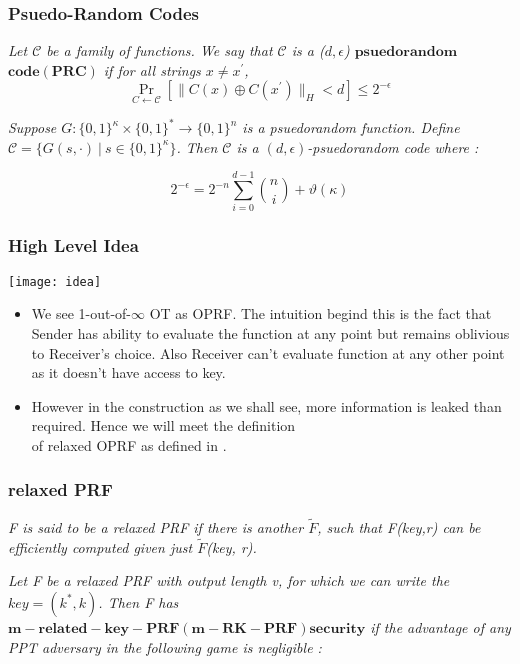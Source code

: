 \documentclass[hyperref={pdfpagelabels=false}]{beamer}
\theoremstyle{remark}
\begin{document}
\begin{frame}
\frametitle{Psuedo-Random Codes}
\begin{definition}[2]
\textit{Let $\mathcal{C}$ be a family of functions. We say that $\mathcal{C}$ is a ($d,\epsilon$) $\mathbf{psuedorandom}$ $\mathbf{code(PRC)}$ if for all strings $x \neq x^\prime$,}
\begin{equation*}
\Pr_{C\leftarrow \mathcal{C}} \left[ \|C(x) \oplus C(x^\prime)\|_H < d \right] \leq 2^{-\epsilon}
\end{equation*}
\end{definition}\pause

\begin{lemma}[1]
\textit{Suppose $G : \{0,1\}^\kappa \times \{0,1\}^* \rightarrow \{0,1\}^n$ is a psuedorandom function. Define $\mathcal{C} = \{G(s,\cdot) \  | \ s \in \{0,1\}^\kappa\}$. Then $\mathcal{C}$ is a $(d,\epsilon)$-psuedorandom code where : }

\begin{equation*}
2^{-\epsilon} = 2^{-n}\sum_{i=0}^{d-1} {n \choose i} + \vartheta(\kappa)
\end{equation*}
\end{lemma}
\end{frame}

\begin{frame}
\frametitle{High Level Idea}
\begin{center}\texttt{[image: idea]}\end{center}
\begin{itemize}

\item We see 1-out-of-$\infty$ OT as OPRF. The intuition begind this is the fact that Sender has ability to  evaluate the function at any point but remains oblivious to Receiver's choice. Also Receiver can't evaluate function at any other point as it doesn't have access to key.\pause

\item However in the construction as we shall see, more information is leaked than required. Hence we will meet the definition\\ of \textsf{relaxed OPRF} as defined in \cite{FIPR}.

\end{itemize}
\end{frame}

\begin{frame}
\frametitle{relaxed PRF}
\begin{definition}[3]
\textit{F is said to be a \textsf{relaxed PRF} if there is another $\widetilde{F}$, such that F(key,r) can be efficiently computed given just $\widetilde{F}$(key, r).}
\end{definition}\pause

\begin{definition}[4]
\textit{Let F be a relaxed PRF with output length v, for which we can write the $key = (k^*,k)$. Then F has $\mathbf{m-related-key-PRF (m-RK-PRF) security}$ if the advantage of any PPT adversary in the following game is negligible :
}
\end{definition}
\end{frame}
\end{document}
